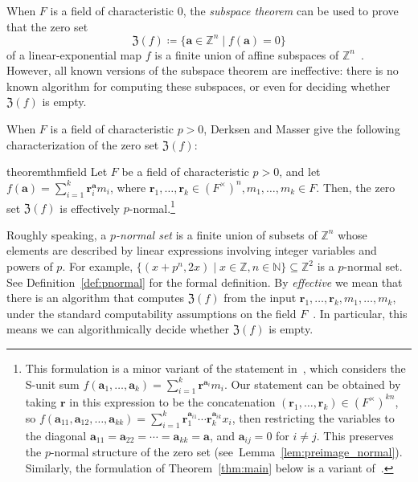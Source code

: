 \documentclass[letterpaper, 11pt, thm-restate]{article}
\numberwithin{equation}{section}
\newcommand{\Z}{\mathbb{Z}}
\newcommand{\N}{\mathbb{N}}
\newcommand{\F}{\mathbb{F}}
\newcommand{\mZ}{\mathfrak{Z}}
\newcommand{\ba}{\boldsymbol{a}}
\newcommand{\br}{\boldsymbol{r}}
\theoremstyle{definition}
\theoremstyle{definition}
\theoremstyle{definition}
\begin{document}
When $F$ is a field of characteristic $0$, the \emph{subspace
theorem} can be used to prove that the zero set 
\[
\mZ(f) \coloneqq \{\ba \in \Z^n \mid f(\ba) = 0\}
\]
of a linear-exponential map $f$ is a finite union of affine subspaces of $\Z^n$~\cite{Evertse1984,PoortenSchlickewei1991}.
However, all known versions of the subspace theorem are ineffective: there is no known algorithm for computing these subspaces, or even for deciding whether $\mZ(f)$ is empty.

When $F$ is a field of characteristic $p > 0$, Derksen and Masser give the following characterization of the zero set $\mZ(f)$:

\begin{restatable}{theorem}{thmfield}\label{thm:DM}
 Let $F$ be a field of characteristic $p > 0$, and let $f(\ba)=\sum_{i = 1}^k\br_i^{\ba} m_i$, where $\br_1, \ldots, \br_k\in (F^{\times})^n, m_1, \ldots, m_k\in F$. 
 Then, the zero set $\mZ(f)$ is effectively $p$-normal.\footnote{This formulation is a minor variant of the statement in~\cite{derksen2012linear}, which considers the S-unit sum $f(\ba_1, \ldots, \ba_k) = \sum_{i = 1}^k\br^{\ba_i} m_i$. 
 Our statement can be obtained by taking $\br$ in this expression to be the concatenation $(\br_1, \ldots, \br_k) \in (F^{\times})^{k n}$, so $f(\ba_{11}, \ba_{12}, \ldots, \ba_{kk}) = \sum_{i = 1}^k\br_1^{\ba_{i1}} \cdots \br_k^{\ba_{ik}} x_i$, then restricting the variables to the diagonal $\ba_{11} = \ba_{22} = \cdots = \ba_{kk} = \ba$, and $\ba_{ij} = 0$ for $i \neq j$.
 This preserves the $p$-normal structure of the zero set (see~Lemma~\ref{lem:preimage_normal}). Similarly, the formulation of Theorem~\ref{thm:main} below is a variant of~\cite{dong2025s}.}
\end{restatable}

Roughly speaking, a \emph{$p$-normal set} is a finite union of subsets of $\Z^n$ whose elements are described by linear expressions involving integer variables and powers of $p$. For example, $\{(x+p^{n}, 2x) \mid x \in \Z, n \in \N\} \subseteq \Z^2$ is a $p$-normal set.
See Definition~\ref{def:pnormal} for the formal definition.
By \emph{effective} we mean that there is an algorithm that computes $\mZ(f)$ from the input $\br_1, \ldots, \br_k, m_1, \ldots, m_k$, under the standard computability assumptions on the field $F$~\cite{baumslag1981computable}.
In particular, this means we can algorithmically decide whether $\mZ(f)$ is empty.
\end{document}
